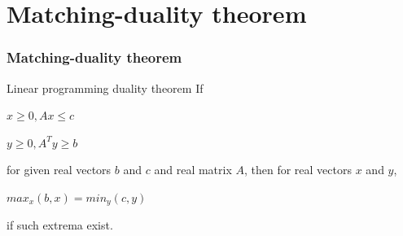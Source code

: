 \documentclass[hyperref={pdfpagelabels=false}]{beamer}
\begin{document}
\section{Matching-duality theorem}
\frame
{
	\frametitle{Matching-duality theorem}

	\begin{block}{Linear programming duality theorem}
		If
		
		\begin{center}
		$x \geq 0, Ax \leq c$ 
		
		$y \geq 0, A^{T}y \geq b$
		\end{center}
		
		for given real vectors $b$ and $c$ and real matrix $A$, then for real vectors $x$ and $y$,
		
		\begin{center}
		$max_{x}(b,x) = min_{y}(c, y)$
		\end{center}
		
		if such extrema exist.
	\end{block}
}

\end{document}
